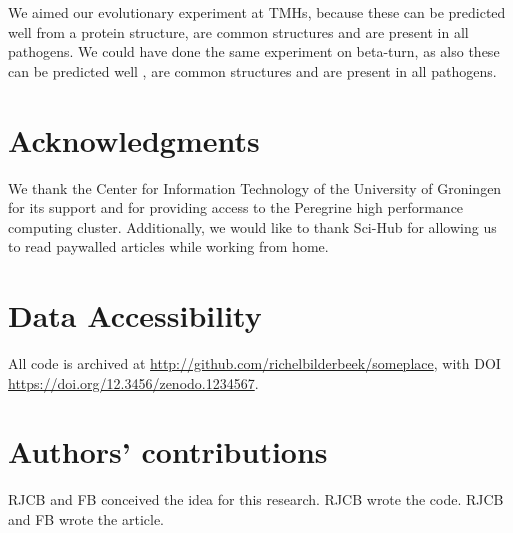We aimed our evolutionary experiment at TMHs, because these can
be predicted well from a protein structure,
are common structures and are present in all pathogens. 
We could have done the same experiment on beta-turn,
as also these can be predicted well \cite{petersen2010netturnp},
are common structures and are present in all pathogens.


\section{Acknowledgments}

We thank the Center for Information Technology of the University 
of Groningen for its support and for providing access to the Peregrine 
high performance computing cluster. 
Additionally, we would like to thank Sci-Hub \cite{himmelstein2018sci}
for allowing us to read paywalled articles while working from home.

\section{Data Accessibility}

All code is archived at \url{http://github.com/richelbilderbeek/someplace},
with DOI \url{https://doi.org/12.3456/zenodo.1234567}.

\section{Authors' contributions}

RJCB and FB conceived the idea for this research. 
RJCB wrote the code.
RJCB and FB wrote the article.





